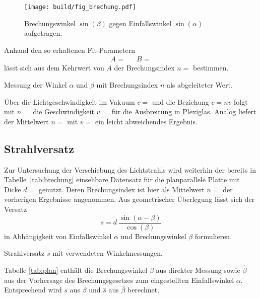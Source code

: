 \begin{figure}[H]
	\texttt{[image: build/fig\_brechung.pdf]}
	\caption{Brechungswinkel $\sin(\beta)$ gegen Einfallswinkel $\sin(\alpha)$ aufgetragen.}
	\label{fig:brechung}
\end{figure}

Anhand den so erhaltenen Fit-Parametern
\begin{align*}
	A =  && B = 
\end{align*}
lässt sich aus dem Kehrwert von $A$ der Brechungsindex $n = $ bestimmen. 

\begin{table}[H]
	\centering
	\caption{Messung der Winkel $\alpha$ und $\beta$ mit Brechungsindex $n$ als abgeleiteter Wert.}
	
	\label{tab:brechung}
\end{table}

Über die Lichtgeschwindigkeit im Vakuum $c = $ \cite{scipy} und die Beziehung $c = nv$ folgt mit $n = $
die Geschwindigkeit $v = $ für die Ausbreitung in Plexiglas. Analog liefert der Mittelwert $n = $
mit $v = $ ein leicht abweichendes Ergebnis.



\subsection{Strahlversatz}

Zur Untersuchung der Verschiebung des Lichtstrahls wird weiterhin der bereits in Tabelle~\ref{tab:brechung} einsehbare Datensatz für die
planparallele Platte mit Dicke $d = $ \cite{reflex} genutzt. Deren Brechungsindex ist hier als Mittelwert
$n = $ der vorherigen Ergebnisse angenommen. Aus geometrischer Überlegung lässt sich der Versatz
\begin{equation*}
	s = d \: \frac{\sin(\alpha - \beta)}{\cos(\beta)}
\end{equation*}
in Abhängigkeit von Einfallswinkel $\alpha$ und Brechungswinkel $\beta$ formulieren.

\begin{table}[H]
	\centering
	\caption{Strahlversatz $s$ mit verwendeten Winkelmessungen.}
	
	\label{tab:plan}
\end{table}

Tabelle \ref{tab:plan} enthält die Brechungswinkel $\beta$ aus direkter Messung sowie $\hat{\beta}$ aus der Vorhersage des Brechungsgesetzes zum
eingestellten Einfallswinkel $\alpha$. Entsprechend wird $s$ aus $\beta$ und $\hat{s}$ aus $\hat{\beta}$ berechnet.


